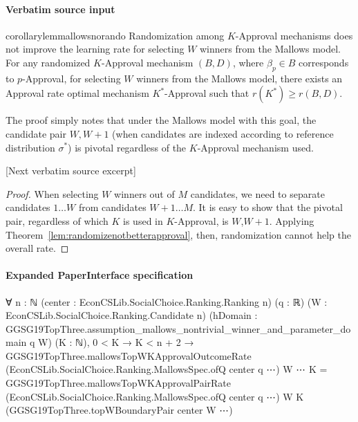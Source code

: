 \documentclass[10pt]{article}
\begin{document}
\paragraph{Verbatim source input}
\begin{ReviewVerbatim}
\begin{restatable}{corollary}{lemmallowsnorando}
	\label{lem:mallowsnorando}
			Randomization among $K$-Approval mechanisms does not improve the learning rate for selecting $W$ winners from the Mallows model. For any randomized $K$-Approval mechanism $(B,D)$, where $\beta_p\in B$ corresponds to $p$-Approval, for selecting $W$ winners from the Mallows model, there exists an Approval rate optimal mechanism $K^*$-Approval such that $r(K^*) \geq r(B,D)$.

\end{restatable}

The proof simply notes that under the Mallows model with this goal, the candidate pair $W, W+1$ (when candidates are indexed according to reference distribution $\sigma^*$) is pivotal regardless of the $K$-Approval mechanism used.

[Next verbatim source excerpt]

\lemmallowsnorando*
\begin{proof}
	When selecting $W$ winners out of $M$ candidates, we need to separate candidates $1 \dots W$ from candidates $W + 1 \dots M$. It is easy to show that the pivotal pair, regardless of which $K$ is used in $K$-Approval, is $W$,$W+1$. Applying Theorem~\ref{lem:randomizenotbetterapproval}, then, randomization cannot help the overall rate.
\end{proof}
\end{ReviewVerbatim}


\paragraph{Expanded PaperInterface specification}
\begin{ReviewVerbatim}
∀ {n : ℕ} (center : EconCSLib.SocialChoice.Ranking.Ranking n) (q : ℝ) (W : EconCSLib.SocialChoice.Ranking.Candidate n)
  (hDomain : GGSG19TopThree.assumption_mallows_nontrivial_winner_and_parameter_domain q W) (K : ℕ),
  0 < K →
    K < n + 2 →
      GGSG19TopThree.mallowsTopWKApprovalOutcomeRate (EconCSLib.SocialChoice.Ranking.MallowsSpec.ofQ center q ⋯) W ⋯ K =
        GGSG19TopThree.mallowsTopWKApprovalPairRate (EconCSLib.SocialChoice.Ranking.MallowsSpec.ofQ center q ⋯) W K
          (GGSG19TopThree.topWBoundaryPair center W ⋯)
\end{ReviewVerbatim}
\end{document}
